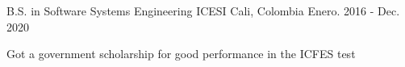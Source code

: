 

\begin{cventries}

  \cventry
    {B.S. in Software Systems Engineering} %
    {ICESI} %
    {Cali, Colombia} %
    {Enero. 2016 - Dec. 2020} %
    {
      \begin{cvitems} %
        \item {Got a government scholarship for good performance in the ICFES test}
      \end{cvitems}
    }

\end{cventries}
